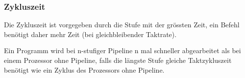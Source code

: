 \subsubsection{Zykluszeit}
Die Zykluszeit ist vorgegeben durch die Stufe mit der grössten Zeit, ein Befehl benötigt daher mehr Zeit (bei gleichbleibender Taktrate).

Ein Programm wird bei n-stufiger Pipeline n mal schneller abgearbeitet als bei einem Prozessor ohne Pipeline, falls die längste Stufe gleiche Taktzykluszeit benötigt wie ein Zyklus des Prozessors ohne Pipeline.






